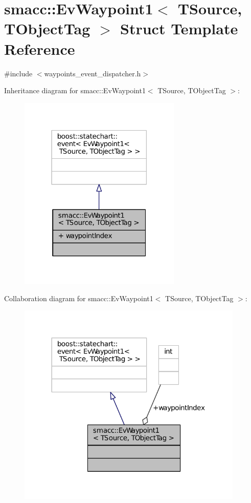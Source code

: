 \hypertarget{structsmacc_1_1EvWaypoint1}{}\section{smacc\+:\+:Ev\+Waypoint1$<$ T\+Source, T\+Object\+Tag $>$ Struct Template Reference}
\label{structsmacc_1_1EvWaypoint1}


{\ttfamily \#include $<$waypoints\+\_\+event\+\_\+dispatcher.\+h$>$}



Inheritance diagram for smacc\+:\+:Ev\+Waypoint1$<$ T\+Source, T\+Object\+Tag $>$\+:
\nopagebreak
\begin{figure}[H]
\begin{center}
\leavevmode
\includegraphics[width=219pt]{structsmacc_1_1EvWaypoint1__inherit__graph}
\end{center}
\end{figure}


Collaboration diagram for smacc\+:\+:Ev\+Waypoint1$<$ T\+Source, T\+Object\+Tag $>$\+:
\nopagebreak
\begin{figure}[H]
\begin{center}
\leavevmode
\includegraphics[width=305pt]{structsmacc_1_1EvWaypoint1__coll__graph}
\end{center}
\end{figure}
